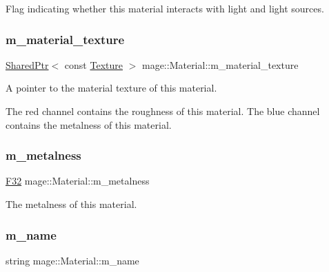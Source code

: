 Flag indicating whether this material interacts with light and light sources. \hypertarget{structmage_1_1_material_aedd606b3cc103ba756aaca9433da0794}{}\label{structmage_1_1_material_aedd606b3cc103ba756aaca9433da0794} 
\subsubsection{\texorpdfstring{m\+\_\+material\+\_\+texture}{m\_material\_texture}}
{\footnotesize\ttfamily \hyperlink{namespacemage_a1e01ae66713838a7a67d30e44c67703e}{Shared\+Ptr}$<$ const \hyperlink{classmage_1_1_texture}{Texture} $>$ mage\+::\+Material\+::m\+\_\+material\+\_\+texture\hspace{0.3cm}{\ttfamily [private]}}

A pointer to the material texture of this material.

The red channel contains the roughness of this material. The blue channel contains the metalness of this material. \hypertarget{structmage_1_1_material_a40b4b6c0e7b940bdf3764b21cb16fbfb}{}\label{structmage_1_1_material_a40b4b6c0e7b940bdf3764b21cb16fbfb} 
\subsubsection{\texorpdfstring{m\+\_\+metalness}{m\_metalness}}
{\footnotesize\ttfamily \hyperlink{namespacemage_aa97e833b45f06d60a0a9c4fc22ae02c0}{F32} mage\+::\+Material\+::m\+\_\+metalness\hspace{0.3cm}{\ttfamily [private]}}

The metalness of this material. \hypertarget{structmage_1_1_material_a2b3e839a8ae093d53b12529d61ec6605}{}\label{structmage_1_1_material_a2b3e839a8ae093d53b12529d61ec6605} 
\subsubsection{\texorpdfstring{m\+\_\+name}{m\_name}}
{\footnotesize\ttfamily string mage\+::\+Material\+::m\+\_\+name\hspace{0.3cm}{\ttfamily [private]}}

